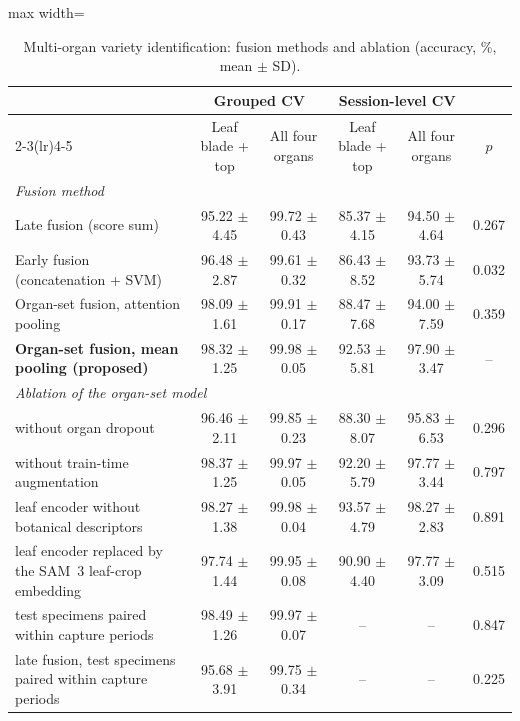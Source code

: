 \begin{table}[tbp]
\centering
\footnotesize
\caption{Multi-organ variety identification: fusion methods and ablation (accuracy, \%, mean $\pm$ SD).}
\label{tab:fusion_main}
\begin{adjustbox}{max width=\textwidth}
\begin{tabular}{lccccc}
\toprule
 & \multicolumn{2}{c}{Grouped CV} & \multicolumn{2}{c}{Session-level CV} & \\ \cmidrule(lr){2-3}\cmidrule(lr){4-5}
 & Leaf blade + top & All four organs & Leaf blade + top & All four organs & $p$ \\
\midrule
\multicolumn{6}{l}{\emph{Fusion method}} \\
Late fusion (score sum) & 95.22 $\pm$ 4.45 & 99.72 $\pm$ 0.43 & 85.37 $\pm$ 4.15 & 94.50 $\pm$ 4.64 & 0.267 \\
Early fusion (concatenation + SVM) & 96.48 $\pm$ 2.87 & 99.61 $\pm$ 0.32 & 86.43 $\pm$ 8.52 & 93.73 $\pm$ 5.74 & 0.032 \\
Organ-set fusion, attention pooling & 98.09 $\pm$ 1.61 & 99.91 $\pm$ 0.17 & 88.47 $\pm$ 7.68 & 94.00 $\pm$ 7.59 & 0.359 \\
\textbf{Organ-set fusion, mean pooling (proposed)} & 98.32 $\pm$ 1.25 & 99.98 $\pm$ 0.05 & 92.53 $\pm$ 5.81 & 97.90 $\pm$ 3.47 & -- \\
\midrule
\multicolumn{6}{l}{\emph{Ablation of the organ-set model}} \\
\quad without organ dropout & 96.46 $\pm$ 2.11 & 99.85 $\pm$ 0.23 & 88.30 $\pm$ 8.07 & 95.83 $\pm$ 6.53 & 0.296 \\
\quad without train-time augmentation & 98.37 $\pm$ 1.25 & 99.97 $\pm$ 0.05 & 92.20 $\pm$ 5.79 & 97.77 $\pm$ 3.44 & 0.797 \\
\quad leaf encoder without botanical descriptors & 98.27 $\pm$ 1.38 & 99.98 $\pm$ 0.04 & 93.57 $\pm$ 4.79 & 98.27 $\pm$ 2.83 & 0.891 \\
\quad leaf encoder replaced by the SAM~3 leaf-crop embedding & 97.74 $\pm$ 1.44 & 99.95 $\pm$ 0.08 & 90.90 $\pm$ 4.40 & 97.77 $\pm$ 3.09 & 0.515 \\
\quad test specimens paired within capture periods & 98.49 $\pm$ 1.26 & 99.97 $\pm$ 0.07 & -- & -- & 0.847 \\
\quad late fusion, test specimens paired within capture periods & 95.68 $\pm$ 3.91 & 99.75 $\pm$ 0.34 & -- & -- & 0.225 \\
\bottomrule
\end{tabular}
\end{adjustbox}
\end{table}